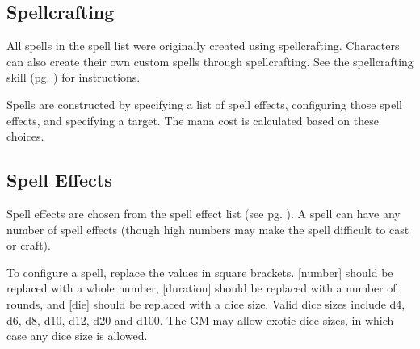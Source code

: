 
\begin{multicols*}{2}
    \section{Spellcrafting}
    All spells in the spell list were originally created using spellcrafting.
    Characters can also create their own custom spells through spellcrafting.
    See the spellcrafting skill (pg. \pageref{skill:spellcrafting}) for
    instructions.

    Spells are constructed by specifying a list of spell effects, configuring
    those spell effects, and specifying a target. The mana cost is calculated
    based on these choices.

    \subsection{Spell Effects}
    Spell effects are chosen from the spell effect list (see pg.
    \pageref{spell-effect-list}). A spell can have any number of spell effects
    (though high numbers may make the spell difficult to cast or craft).

    To configure a spell, replace the values in square brackets. [number] should
    be replaced with a whole number, [duration] should be replaced with a number
    of rounds, and [die] should be replaced with a
    dice size. Valid dice sizes include d4, d6, d8, d10, d12, d20 and d100.
    The GM may allow exotic dice sizes, in which case any dice size is allowed.


\end{multicols*}
